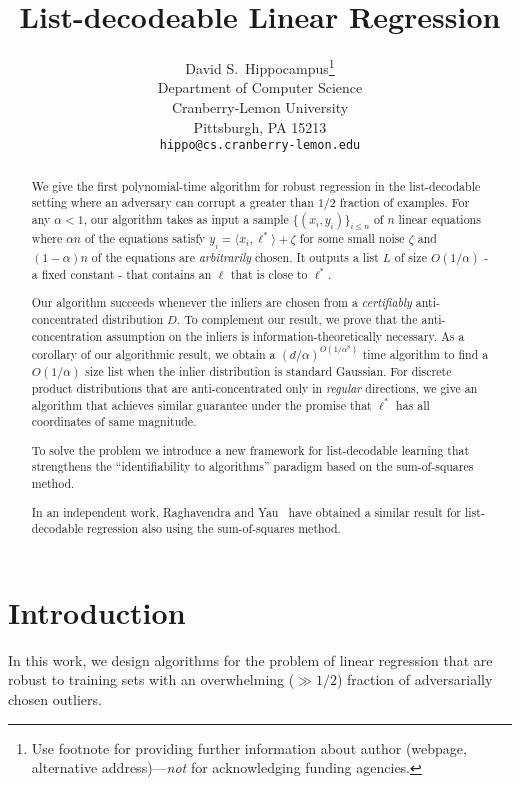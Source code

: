 \documentclass{article}
\title{List-decodeable Linear Regression}
\author{%
  David S.~Hippocampus\thanks{Use footnote for providing further information
    about author (webpage, alternative address)---\emph{not} for acknowledging
    funding agencies.} \\
  Department of Computer Science\\
  Cranberry-Lemon University\\
  Pittsburgh, PA 15213 \\
  \texttt{hippo@cs.cranberry-lemon.edu} \\
}
\theoremstyle{definition}
\theoremstyle{remark}
\renewcommand{\leq}{\leqslant}
\numberwithin{equation}{section}
\newcommand{\1}{\bm{1}}
\begin{document}
\maketitle

\begin{abstract}
We give the first polynomial-time algorithm for robust regression in the list-decodable setting where an adversary can corrupt a greater than $1/2$ fraction of examples. %
For any $\alpha < 1$, our algorithm takes as input a sample $\{ (x_i,y_i)\}_{i \leq n}$ of $n$ linear equations where $\alpha n$ of the equations satisfy $y_i = \langle x_i,\ell^*\rangle +\zeta$ for some small noise $\zeta$ and $(1-\alpha)n$ of the equations are {\em arbitrarily} chosen. It outputs a list $L$ of size $O(1/\alpha)$ - a fixed constant - that contains an $\ell$ that is close to $\ell^*$.

Our algorithm succeeds whenever the inliers are chosen from a \emph{certifiably} anti-concentrated distribution $D$. To  complement our result, we prove that the anti-concentration assumption on the inliers is information-theoretically necessary. As a corollary of our algorithmic result, we obtain a $(d/\alpha)^{O(1/\alpha^8)}$ time algorithm to find a $O(1/\alpha)$ size list when the inlier distribution is standard Gaussian. For discrete product distributions that are anti-concentrated only in \emph{regular} directions, we give an algorithm that achieves similar guarantee under the promise that $\ell^*$ has all coordinates of same magnitude.


To solve the problem we introduce a new framework for list-decodable learning that strengthens the ``identifiability to algorithms'' paradigm based on the sum-of-squares method.

In an independent work, Raghavendra and Yau~\cite{RY19} have obtained a similar result for list-decodable regression also using the sum-of-squares method.
\end{abstract}

\section{Introduction}

In this work, we design algorithms for the problem of linear regression that are robust to training sets with an overwhelming ($\gg 1/2$) fraction of adversarially chosen outliers. 
\end{document}
